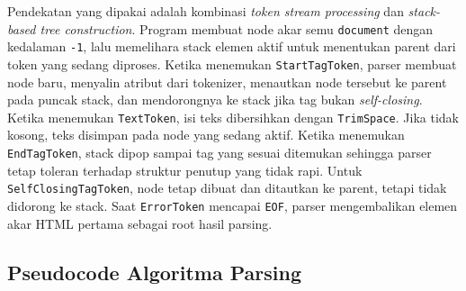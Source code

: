 Pendekatan yang dipakai adalah kombinasi \textit{token stream processing} dan \textit{stack-based tree construction}. Program membuat node akar semu \texttt{document} dengan kedalaman \texttt{-1}, lalu memelihara stack elemen aktif untuk menentukan parent dari token yang sedang diproses. Ketika menemukan \texttt{StartTagToken}, parser membuat node baru, menyalin atribut dari tokenizer, menautkan node tersebut ke parent pada puncak stack, dan mendorongnya ke stack jika tag bukan \textit{self-closing}. Ketika menemukan \texttt{TextToken}, isi teks dibersihkan dengan \texttt{TrimSpace}. Jika tidak kosong, teks disimpan pada node yang sedang aktif. Ketika menemukan \texttt{EndTagToken}, stack dipop sampai tag yang sesuai ditemukan sehingga parser tetap toleran terhadap struktur penutup yang tidak rapi. Untuk \texttt{SelfClosingTagToken}, node tetap dibuat dan ditautkan ke parent, tetapi tidak didorong ke stack. Saat \texttt{ErrorToken} mencapai \texttt{EOF}, parser mengembalikan elemen akar HTML pertama sebagai root hasil parsing.

\subsection{Pseudocode Algoritma Parsing}

